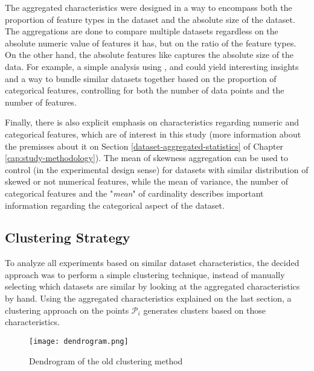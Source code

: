 The aggregated characteristics were designed in a way to encompass both the proportion of feature types in the dataset and the absolute size of the dataset. The  aggregations are done to compare multiple datasets regardless on the absolute numeric value of features it has, but on the ratio of the feature types. On the other hand, the absolute features like  captures the absolute size of the data. For example, a simple analysis using ,  and  could yield interesting insights and a way to bundle similar datasets together based on the proportion of categorical features, controlling for both the number of data points and the number of features. 

Finally, there is also explicit emphasis on characteristics regarding numeric and categorical features, which are of interest in this study (more information about the premisses about it on Section \ref{dataset-aggregated-statistics} of Chapter \ref{cap:study-methodology}). The mean of skewness aggregation can be used to control (in the experimental design sense) for datasets with similar distribution of skewed or not numerical features, while the mean of variance, the number of categorical features and the "\textit{mean}" of cardinality describes important information regarding the categorical aspect of the dataset.  

\subsection{Clustering Strategy}
\label{subsec:clustering-strat}
To analyze all experiments based on similar dataset characteristics, the decided approach was to perform a simple clustering technique, instead of manually selecting which datasets are similar by looking at the aggregated characteristics by hand. Using the aggregated characteristics explained on the last section, a clustering approach on the points $\mathcal{P}_i$ generates clusters based on those characteristics.

\begin{figure}[!h]
    \centering
    \texttt{[image: dendrogram.png]}
    \caption{Dendrogram of the old clustering method}
    \label{fig:dendrogram}
\end{figure}

